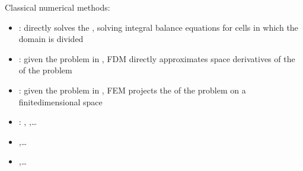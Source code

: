 \documentclass[letterpaper,10pt,english]{jupyterBook}
\begin{document}
\sphinxAtStartPar
Classical numerical methods:
\begin{itemize}
\item {} 
\sphinxAtStartPar
{}: directly solves the , solving integral balance equations for cells in which the domain is divided

\item {} 
\sphinxAtStartPar
{}: given the problem in , FDM directly approximates space derivatives of the  of the problem

\item {} 
\sphinxAtStartPar
{}: given the problem in , FEM projects the  of the problem on a finite\sphinxhyphen{}dimensional space

\item {} 
\sphinxAtStartPar
{}: , ,…

\item {} 
\sphinxAtStartPar
{},…

\item {} 
\sphinxAtStartPar
{},…

\end{itemize}
\end{document}

